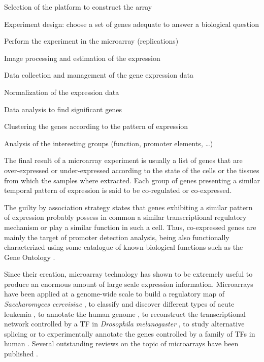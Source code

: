 \begin{menumerate}
\item
Selection of the platform to construct the array
\item
Experiment design: choose a set of genes adequate to answer a biological question
\item
Perform the experiment in the microarray (replications)
\item
Image processing and estimation of the expression
\item
Data collection and management of the gene expression data
\item
Normalization of the expression data
\item
Data analysis to find significant genes
\item
Clustering the genes according to the pattern of expression
\item
Analysis of the interesting groups (function, promoter elements, \ldots)
\end{menumerate}

The final result of
a microarray experiment is usually a list of genes that are over-expressed or under-expressed
according to the state of the cells or the tissues from which the samples where extracted. Each
group of genes presenting a similar temporal pattern of expression is said to be co-regulated or
co-expressed. 

The guilty by association strategy states that genes exhibiting a similar pattern of expression
probably possess in common a similar transcriptional regulatory mechanism or play a similar function
in such a cell. Thus, co-expressed genes are mainly the target of promoter detection analysis, 
being also functionally characterized using some catalogue of known biological functions such as 
the Gene Ontology \citep{tgoc:2000a}.

Since their creation, microarray technology has shown to be extremely useful to produce an enormous
amount of large scale expression information. Microarrays have been applied at a genome-wide scale 
to build a regulatory map of \emph{Saccharomyces cerevisiae} \citep{harbison:2004a}, to classify 
and discover different types of acute leukemia \citep{golub:1999a}, to annotate the human genome 
\citep{shoemaker:2001a}, to reconstruct the transcriptional network controlled by a TF in 
\emph{Drosophila melanogaster} \citep{beltran:2003a}, to study alternative splicing \citep{relogio:2005a} or 
to experimentally annotate the genes controlled by a family of TFs in human \citep{odom:2004a}.
Several outstanding reviews on the topic of microarrays have been published 
\citep{various:1999a,various:2001a}.


